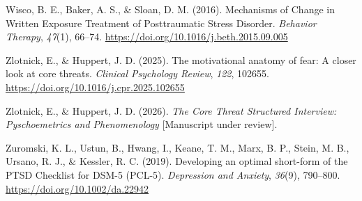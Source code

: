 \documentclass[
  man,floatsintext]{apa7}
\newlength{\cslhangindent}
\newlength{\cslentryspacingunit} %
\newenvironment{CSLReferences}[2] %
 {%
  \setlength{\parindent}{0pt}
  \ifodd #1
  \let\oldpar\par
  \def\par{\hangindent=\cslhangindent\oldpar}
  \fi
  \setlength{\parskip}{#2\cslentryspacingunit}
 }%
 {}
\begin{document}
\begin{CSLReferences}{1}{0}
\leavevmode{}%
Wisco, B. E., Baker, A. S., \& Sloan, D. M. (2016). Mechanisms of Change in Written Exposure Treatment of Posttraumatic Stress Disorder. \emph{Behavior Therapy}, \emph{47}(1), 66--74. \url{https://doi.org/10.1016/j.beth.2015.09.005}

\leavevmode{}%
Zlotnick, E., \& Huppert, J. D. (2025). The motivational anatomy of fear: A closer look at core threats. \emph{Clinical Psychology Review}, \emph{122}, 102655. \url{https://doi.org/10.1016/j.cpr.2025.102655}

\leavevmode{}%
Zlotnick, E., \& Huppert, J. D. (2026). \emph{The Core Threat Structured Interview: Pyschoemetrics and Phenomenology} {[}Manuscript under review{]}.

\leavevmode{}%
Zuromski, K. L., Ustun, B., Hwang, I., Keane, T. M., Marx, B. P., Stein, M. B., Ursano, R. J., \& Kessler, R. C. (2019). Developing an optimal short-form of the PTSD Checklist for DSM-5 (PCL-5). \emph{Depression and Anxiety}, \emph{36}(9), 790--800. \url{https://doi.org/10.1002/da.22942}

\end{CSLReferences}
\end{document}
